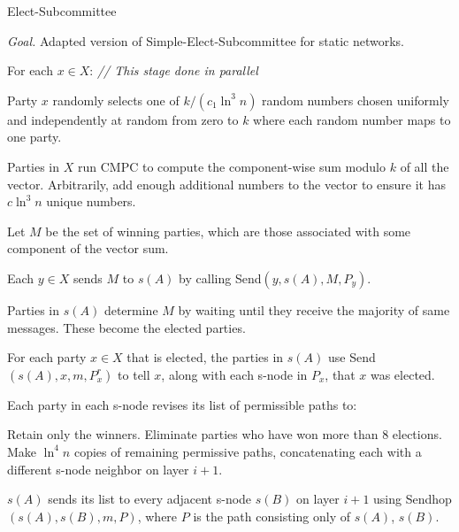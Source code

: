 \documentclass[11pt,letter]{article}
\theoremstyle{mytheoremstyle}
\let\savedCaption=\caption
\renewcommand*{\caption}[1]{\savedCaption[#1]{~#1}}
\newcommand{\algfont}{}
\newcommand{\hw}{\mbox{\textsf{CMPC}}\xspace}
\newcommand{\Sendhop}{\textsf{Sendhop}}
\newcommand{\Send}{\textsf{Send}}
\newenvironment{indentpar}[1]{\begin{list}{}{\setlength{\leftmargin}{#1}}\item[]}
{\end{list}}
\newcommand{\es}{\mbox{\textsf{Elect-Subcommittee}}\xspace}
\newcommand{\simplees}{\mbox{\textsf{Simple-Elect-Subcommittee}}\xspace}
\begin{document}
\begin{algorithm}
	\caption{\es}
	\medskip
	\algfont
	\textit{Goal.} Adapted version of \simplees for static networks.
	\medskip
	\begin{enumerate}
		\item For each  $x \in X$: {\em   // This stage done in parallel}
		\item
		\begin{indentpar}{0.5cm}
			Party $x$ randomly selects one of $k/(c_1\ln^3 n)$ random numbers chosen uniformly and independently at random from zero to $k$ where each random number maps to one party.
		\end{indentpar}
		\item Parties in $X$ run \hw to compute the component-wise sum modulo $k$ of all the vector. Arbitrarily, add enough additional numbers to the vector to ensure it has $c\ln^3{n}$ unique numbers.
		\item Let $M$ be the set of winning parties, which are those associated with some component of the vector sum.
		\item
		\begin{indentpar}{0.5cm}
			Each $y \in X$ sends $M$ to $s(A)$ by calling \Send$(y, s(A),M, P_y)$.
		\end{indentpar}
		\item
		\begin{indentpar}{0.5cm}
			Parties in $s(A)$ determine $M$ by waiting until they receive the majority of same messages. These become the elected parties.
		\end{indentpar}
		\item For each party $x \in X$ that is elected, the parties in $s(A)$ use  \Send$(s(A), x, m, P^r_x)$ to tell $x$, along with each \textsf{s-node} in $P_x$, that $x$ was elected.
		\item Each party in each \textsf{s-node} revises its list of permissible paths to:
		\begin{indentpar}{0.5cm}
			Retain only the winners.
			Eliminate parties who have won more than 8 elections.
			Make $\ln^4{n}$ copies of remaining permissive paths, concatenating each with a different \textsf{s-node} neighbor on layer $i + 1$.
		\end{indentpar}
		\item $s(A)$ sends its list to every adjacent \textsf{s-node} $s(B)$ on layer $i + 1$ using \Sendhop$(s(A), s(B), m, P)$, where $P$ is the path consisting only of $s(A)$, $s(B)$.
	\end{enumerate}
\end{algorithm}
\end{document}
